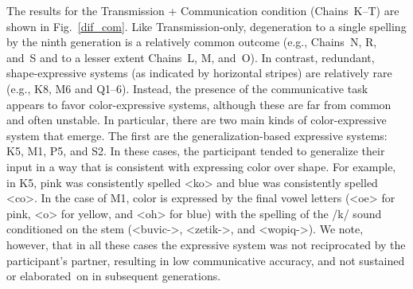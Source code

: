 \documentclass[doc,biblatex]{apa7}
\begin{document}
The results for the Transmission + Communication condition (Chains~K--T) are shown in Fig.~\ref{dif_com}. Like Transmission-only, degeneration to a single spelling by the ninth generation is a relatively common outcome (e.g., Chains~N, R, and~S and to a lesser extent Chains~L, M, and~O). In contrast, redundant, shape-expressive systems (as indicated by horizontal stripes) are relatively rare (e.g., K8, M6 and Q1--6). Instead, the presence of the communicative task appears to favor color-expressive systems, although these are far from common and often unstable. In particular, there are two main kinds of color-expressive system that emerge. The first are the generalization-based expressive systems: K5, M1, P5, and S2. In these cases, the participant tended to generalize their input in a way that is consistent with expressing color over shape. For example, in K5, pink was consistently spelled <ko> and blue was consistently spelled <co>. In the case of M1, color is expressed by the final vowel letters (<oe> for pink, <o> for yellow, and <oh> for blue) with the spelling of the /k/ sound conditioned on the stem (<buvic->, <zetik->, and <wopiq->). We note, however, that in all these cases the expressive system was not reciprocated by the participant's partner, resulting in low communicative accuracy, and not sustained or elaborated~on in subsequent generations.
\end{document}
